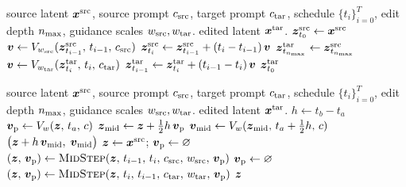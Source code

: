 \begin{algorithm}[htpb]
    \caption{\textbf{ODE Inversion} --- Two-pass source-inversion editing.}
    \label{alg:odeinversion}
    \begin{algorithmic}[1]
     source latent $\boldsymbol{x}^{\mathrm{src}}$, source prompt $c_{\mathrm{src}}$, target prompt $c_{\mathrm{tar}}$, schedule $\{t_i\}_{i=0}^{T}$, edit depth $n_{\max}$, guidance scales $w_{\mathrm{src}},w_{\mathrm{tar}}$.
     edited latent $\boldsymbol{x}^{\mathrm{tar}}$.
    \State $\boldsymbol{z}^{\mathrm{src}}_{t_0} \leftarrow \boldsymbol{x}^{\mathrm{src}}$
        \State $\boldsymbol{v} \leftarrow V_{w_{\mathrm{src}}}(\boldsymbol{z}^{\mathrm{src}}_{t_{i-1}},\,t_{i-1},\,c_{\mathrm{src}})$
        \State $\boldsymbol{z}^{\mathrm{src}}_{t_i} \leftarrow \boldsymbol{z}^{\mathrm{src}}_{t_{i-1}} + (t_i-t_{i-1})\,\boldsymbol{v}$
    \EndFor
    \State $\boldsymbol{z}^{\mathrm{tar}}_{t_{n_{\max}}} \leftarrow \boldsymbol{z}^{\mathrm{src}}_{t_{n_{\max}}}$
        \State $\boldsymbol{v} \leftarrow V_{w_{\mathrm{tar}}}(\boldsymbol{z}^{\mathrm{tar}}_{t_i},\,t_i,\,c_{\mathrm{tar}})$
        \State $\boldsymbol{z}^{\mathrm{tar}}_{t_{i-1}} \leftarrow \boldsymbol{z}^{\mathrm{tar}}_{t_i} + (t_{i-1}-t_i)\,\boldsymbol{v}$
    \EndFor
    \State \Return $\boldsymbol{z}^{\mathrm{tar}}_{t_0}$
    \end{algorithmic}
\end{algorithm}

\begin{algorithm}[htpb]
    \caption{\textbf{FireFlow} --- Second-order midpoint inversion with velocity reuse.}
    \label{alg:fireflow}
    \begin{algorithmic}[1]
     source latent $\boldsymbol{x}^{\mathrm{src}}$, source prompt $c_{\mathrm{src}}$, target prompt $c_{\mathrm{tar}}$, schedule $\{t_i\}_{i=0}^{T}$, edit depth $n_{\max}$, guidance scales $w_{\mathrm{src}},w_{\mathrm{tar}}$.
     edited latent $\boldsymbol{x}^{\mathrm{tar}}$.
        \State $h \leftarrow t_b - t_a$
            \State $\boldsymbol{v}_{\mathrm{p}} \leftarrow V_{w}(\boldsymbol{z},\,t_a,\,c)$
        \EndIf
        \State $\boldsymbol{z}_{\mathrm{mid}} \leftarrow \boldsymbol{z} + \frac{1}{2}h\,\boldsymbol{v}_{\mathrm{p}}$
        \State $\boldsymbol{v}_{\mathrm{mid}} \leftarrow V_{w}(\boldsymbol{z}_{\mathrm{mid}},\,t_a+\frac{1}{2}h,\,c)$
        \State \Return $\big(\boldsymbol{z} + h\,\boldsymbol{v}_{\mathrm{mid}},\; \boldsymbol{v}_{\mathrm{mid}}\big)$
    \EndFunction
    \State $\boldsymbol{z} \leftarrow \boldsymbol{x}^{\mathrm{src}}$; \quad $\boldsymbol{v}_{\mathrm{p}} \leftarrow \varnothing$
        \State $(\boldsymbol{z},\,\boldsymbol{v}_{\mathrm{p}}) \leftarrow \textsc{MidStep}(\boldsymbol{z},\,t_{i-1},\,t_i,\,c_{\mathrm{src}},\,w_{\mathrm{src}},\,\boldsymbol{v}_{\mathrm{p}})$
    \EndFor
    \State $\boldsymbol{v}_{\mathrm{p}} \leftarrow \varnothing$ 
        \State $(\boldsymbol{z},\,\boldsymbol{v}_{\mathrm{p}}) \leftarrow \textsc{MidStep}(\boldsymbol{z},\,t_i,\,t_{i-1},\,c_{\mathrm{tar}},\,w_{\mathrm{tar}},\,\boldsymbol{v}_{\mathrm{p}})$
    \EndFor
    \State \Return $\boldsymbol{z}$
    \end{algorithmic}
\end{algorithm}

